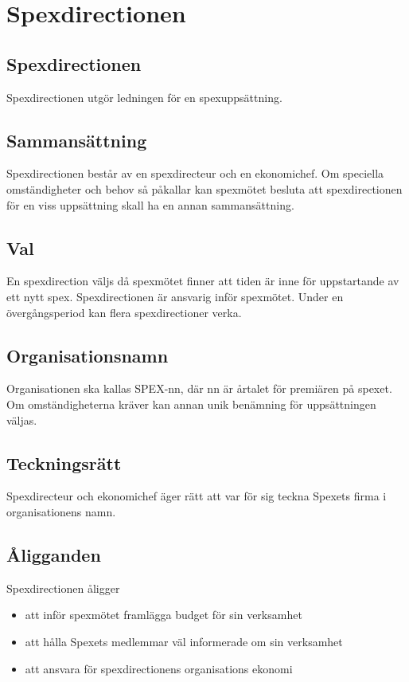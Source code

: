 \documentclass[a4paper]{article}
\begin{document}
\section{Spexdirectionen}
\label{section:spexdirectionen}

\subsection{Spexdirectionen}
Spexdirectionen utgör ledningen för en spexuppsättning.

\subsection{Sammansättning}
Spexdirectionen består av en spexdirecteur och en ekonomichef.\newline
\newline
Om speciella omständigheter och behov så påkallar kan spexmötet besluta att spexdirectionen för en viss uppsättning skall ha en annan sammansättning.

\subsection{Val}
En spexdirection väljs då spexmötet finner att tiden är inne för uppstartande av ett nytt spex. Spexdirectionen är ansvarig inför spexmötet. Under en övergångsperiod kan flera spexdirectioner verka.

\subsection{Organisationsnamn}
Organisationen ska kallas SPEX-nn, där nn är årtalet för premiären på spexet. Om omständigheterna kräver kan annan unik benämning för uppsättningen väljas.

\subsection{Teckningsrätt}
Spexdirecteur och ekonomichef äger rätt att var för sig teckna Spexets firma i organisationens namn.

\subsection{Åligganden}
Spexdirectionen åligger

\begin{itemize}
  \item att inför spexmötet framlägga budget för sin verksamhet
  \item att hålla Spexets medlemmar väl informerade om sin verksamhet
  \item att ansvara för spexdirectionens organisations ekonomi
\end{itemize}
\end{document}
